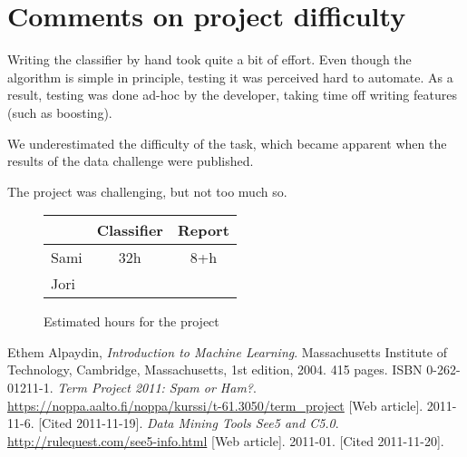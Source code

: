\documentclass[a4paper,10pt]{article}
\begin{document}
\section{Comments on project difficulty}

Writing the classifier by hand took quite a bit of effort.  Even though
the algorithm is simple in principle, testing it was perceived hard to
automate.  As a result, testing was done ad-hoc by the developer, taking
time off writing features (such as boosting).

We underestimated the difficulty of the task, which became apparent when
the results of the data challenge were published.

The project was challenging, but not too much so.

\begin{figure}
  \centering
\begin{tabular}{|l|c|c|}
\hline
 & Classifier & Report \\ \hline
Sami & 32h & 8+h \\ %
Jori &  &  \\
\hline
\end{tabular}
  \caption{Estimated hours for the project}
  \label{tbl:effort-estimate} 
\end{figure}

\pagebreak
\begin{thebibliography}{9}
  Ethem Alpaydin,
  \emph{Introduction to Machine Learning}.
  Massachusetts Institute of Technology, Cambridge, Massachusetts,
  1st edition,
  2004. 415 pages. ISBN 0-262-01211-1.
  \emph{Term Project 2011: Spam or Ham?}.
  \href{https://noppa.aalto.fi/noppa/kurssi/t-61.3050/term\_project}
  {https://noppa.aalto.fi/noppa/kurssi/t-61.3050/term\_project}
  [Web article]. 2011-11-6. [Cited 2011-11-19].
  \emph{Data Mining Tools See5 and C5.0}.
  \href{http://rulequest.com/see5-info.html}
  {http://rulequest.com/see5-info.html}
  [Web article]. 2011-01. [Cited 2011-11-20].

\end{thebibliography}
\end{document}
